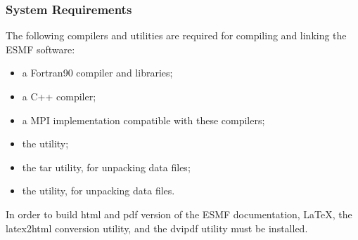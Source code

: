 
\subsubsection{System Requirements}
\label{sec:systemreq}

The following compilers and utilities are required for compiling and 
linking the ESMF software:
\begin{itemize}
\item a Fortran90 compiler and libraries;
\item a C++ compiler;
\item a MPI implementation compatible with these compilers;
\item the  utility; 
\item the tar utility, for unpacking data files;
\item the  utility, for unpacking data files.
\end{itemize} 

In order to build html and pdf version of the ESMF documentation, 
\LaTeX, the latex2html conversion utility, and the dvipdf 
utility must be installed.







